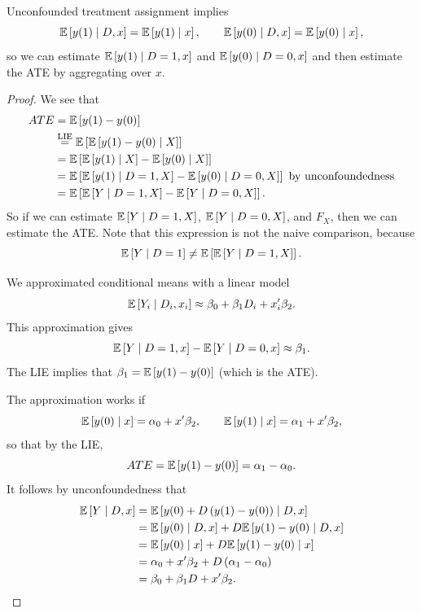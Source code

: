 \begin{proposition}
	Unconfounded treatment assignment implies
	\[
		\mathbb{E}\left[y(1) \mid D, x\right] = \mathbb{E}\left[y(1) \mid x\right], \qquad
		\mathbb{E}\left[y(0) \mid D, x\right] = \mathbb{E}\left[y(0) \mid x\right]
	,\]
	so we can estimate $\mathbb{E}\left[y(1) \mid D=1, x\right]$ and $\mathbb{E}\left[y(0) \mid D=0, x\right]$ and then estimate the ATE by aggregating over $x$.
\end{proposition}
\begin{proof}
	We see that 
	\begin{align*}
		ATE
		&= \mathbb{E}\left[y(1) - y(0)\right] \\
		&\overset{\text{LIE}}{=} \mathbb{E}\left[\mathbb{E}\left[y(1) - y(0) \mid X\right] \right] \\
		&= \mathbb{E}\left[\mathbb{E}\left[y(1) \mid X\right] - \mathbb{E}\left[y(0) \mid X\right] \right] \\
		&= \mathbb{E}\left[\mathbb{E}\left[y(1) \mid D=1,X\right] - \mathbb{E}\left[y(0) \mid D =0 , X\right] \right]  \text{ by unconfoundedness} \\
		&= \mathbb{E}\left[\mathbb{E}\left[Y \mid D = 1 , X\right] - \mathbb{E}\left[Y \mid D = 0, X\right] \right]
	.\end{align*}
	So if we can estimate $\mathbb{E}\left[Y \mid D=1, X\right] $, $\mathbb{E}\left[Y \mid D=0, X\right] $, and $F_X$, then we can estimate the ATE.
		Note that this expression is not the naive comparison, because \[
			\mathbb{E}\left[Y \mid D= 1\right]  \ne \mathbb{E}\left[\mathbb{E}\left[Y \mid D=1 ,X\right] \right] 
		.\] 

	We approximated conditional means with a linear model
	\[
		\mathbb{E}\left[Y_i \mid D_i, x_i\right] \approx \beta_0 + \beta_1 D_i + x_i'\beta_2
	.\]
	This approximation gives
	\[
		\mathbb{E}\left[Y \mid D=1, x\right] - \mathbb{E}\left[Y \mid D=0, x\right] \approx \beta_1
	.\]
	The LIE implies that $\beta_1 = \mathbb{E}\left[y(1)-y(0)\right]$ (which is the ATE).

		The approximation works if
		\[
			\mathbb{E}\left[y(0) \mid x\right] = \alpha_0 + x'\beta_2, \qquad
			\mathbb{E}\left[y(1) \mid x\right] = \alpha_1 + x'\beta_2
	,\]
	so that by the LIE,
	\[
		ATE = \mathbb{E}\left[y(1)-y(0)\right] = \alpha_1 - \alpha_0
	.\]
		It follows by unconfoundedness that
	\begin{align*}
		\mathbb{E}\left[Y \mid D, x\right]
		&= \mathbb{E}\left[y(0) + D\left(y(1)-y(0)\right) \mid D, x\right] \\
		&= \mathbb{E}\left[y(0) \mid D, x\right] + D\mathbb{E}\left[y(1)-y(0) \mid D, x\right] \\
		&= \mathbb{E}\left[y(0) \mid x\right] + D\mathbb{E}\left[y(1)-y(0) \mid x\right] \\
		&= \alpha_0 + x'\beta_2 + D\left(\alpha_1-\alpha_0\right) \\
		&= \beta_0 + \beta_1 D + x'\beta_2
	.\end{align*}


\end{proof}
